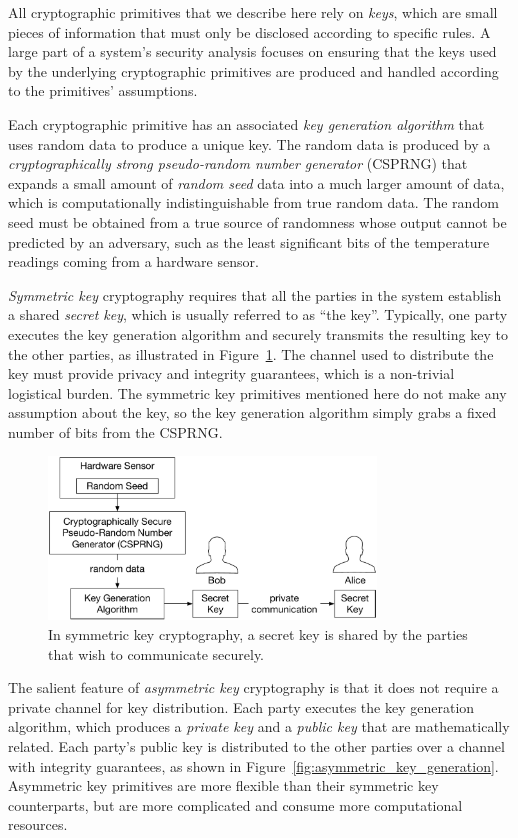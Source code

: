 All cryptographic primitives that we describe here rely on \textit{keys}, which
are small pieces of information that must only be disclosed according to
specific rules. A large part of a system's security analysis focuses on
ensuring that the keys used by the underlying cryptographic primitives are
produced and handled according to the primitives' assumptions.

Each cryptographic primitive has an associated \textit{key generation
algorithm} that uses random data to produce a unique key. The random data is
produced by a \textit{cryptographically strong pseudo-random number generator}
(CSPRNG) that expands a small amount of \textit{random seed} data into a much
larger amount of data, which is computationally indistinguishable from true
random data. The random seed must be obtained from a true source of randomness
whose output cannot be predicted by an adversary, such as the least significant
bits of the temperature readings coming from a hardware sensor.

\textit{Symmetric key} cryptography requires that all the parties in the system
establish a shared \textit{secret key}, which is usually referred to as ``the
key''. Typically, one party executes the key generation algorithm and securely
transmits the resulting key to the other parties, as illustrated in
Figure~\ref{fig:symmetric_key_generation}. The channel used to
distribute the key must provide privacy and integrity guarantees, which is a
non-trivial logistical burden. The symmetric key primitives mentioned here do
not make any assumption about the key, so the key generation algorithm simply
grabs a fixed number of bits from the CSPRNG.

\begin{figure}[hbt]
  \centering
  \includegraphics[width=87mm]{figures/symmetric_key_generation.pdf}
  \caption{
    In symmetric key cryptography, a secret key is shared by the parties that
    wish to communicate securely.
  }
  \label{fig:symmetric_key_generation}
\end{figure}

The salient feature of \textit{asymmetric key} cryptography is that it does not
require a private channel for key distribution. Each party executes the key
generation algorithm, which produces a \textit{private key} and a
\textit{public key} that are mathematically related. Each party's public key
is distributed to the other parties over a channel with integrity guarantees,
as shown in Figure~\ref{fig:asymmetric_key_generation}.
Asymmetric key primitives are more flexible than their symmetric key
counterparts, but are more complicated and consume more computational
resources.

